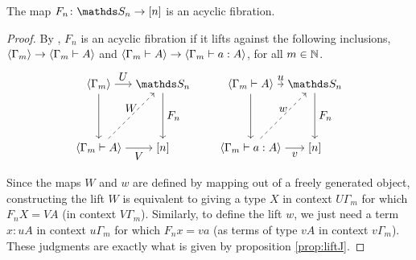 \documentclass{article}
\begin{document}
\begin{cor}
    The map $F_n\colon\bS_n\to[n]$ is an acyclic fibration.
\end{cor}
\begin{proof}
    By \cite{KL}, $F_n$ is an acyclic fibration if it lifts against the following inclusions, $\langle\Gamma_m\rangle\to\langle\Gamma_m\vdash A\rangle$ and $\langle\Gamma_m\vdash A\rangle\to\langle\Gamma_m\vdash a:A\rangle$, for all $m\in\mathbb{N}$.
    \[\begin{matrix}\begin{tikzpicture}
        \node (A) at (0,0) {$\gen{\Gamma_m}$};
        \node (X) at (2,0) {$\bS_n$};
        \node (B) at (0,-2) {$\gen{\Gamma_m\vdash A}$};
        \node (Y) at (2,-2) {$[n]$};
        \draw[->] (A) to (B);
        \draw[->] (A) to node[above]{$U$} (X);
        \draw[->] (X) to node[right]{$F_n$} (Y);
        \draw[->] (B) to node[below]{$V$} (Y);
        \draw[->, dashed] (B) to node[above]{$W$} (X);
    \end{tikzpicture}\end{matrix}\qquad
    \begin{matrix}\begin{tikzpicture}
        \node (A) at (0,0) {$\gen{\Gamma_m\vdash A}$};
        \node (X) at (2,0) {$\bS_n$};
        \node (B) at (0,-2) {$\gen{\Gamma_m\vdash a:A}$};
        \node (Y) at (2,-2) {$[n]$};
        \draw[->] (A) to (B);
        \draw[->] (A) to node[above]{$u$} (X);
        \draw[->] (X) to node[right]{$F_n$} (Y);
        \draw[->] (B) to node[below]{$v$} (Y);
        \draw[->, dashed] (B) to node[above]{$w$} (X);
    \end{tikzpicture}\end{matrix}\]
    Since the maps $W$ and $w$ are defined by mapping out of a freely generated object, constructing the lift $W$ is equivalent to giving a type $X$ in context $U\Gamma_m$ for which $F_nX=VA$ (in context $V\Gamma_m$). Similarly, to define the lift $w$, we just need a term $x:uA$ in context $u\Gamma_m$ for which $F_nx=va$ (as terms of type $vA$ in context $v\Gamma_m$). These judgments are exactly what is given by proposition \ref{prop:liftJ}.
\end{proof}
\end{document}
